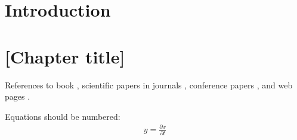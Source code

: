 \documentclass[a4paper,twoside,12pt]{book}
\newcounter{pagesWithoutNumbers}
\begin{document}
\setcounter{pagesWithoutNumbers}{\value{page}}
\mainmatter
\pagestyle{empty}
 
\cleardoublepage

\pagestyle{PageNumbersChapterTitles}


\chapter{Introduction}


\chapter{[Chapter title]}



References to 
book \cite{bib:book},
scientific papers in journals \cite{bib:article},
conference papers \cite{bib:conference},
and web pages \cite{bib:internet}.

Equations should be numbered:
\begin{align}
y = \frac{\partial x}{\partial t}
\end{align}
\end{document}

